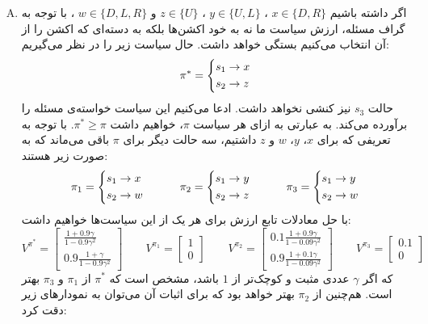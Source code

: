 \documentclass[a4paper, 12pt]{article}
\begin{document}
\begin{enumerate}[A)]
	\item
	اگر داشته باشیم
	$x \in \{D, R\}$
	،
	$y \in \{U, L\}$
	،
	$z \in \{U\}$
	و
	$w \in \{D, L, R\}$
	،
	با توجه به گراف مسئله، ارزش سیاست ما نه به خود اکشن‌ها بلکه به دسته‌ای که اکشن را از آن انتخاب می‌کنیم بستگی خواهد داشت. حال سیاست زیر را در نظر می‌گیریم:
	\[
	\pi^{\ast} = \begin{dcases}
		s_1 \to x \\
		s_2 \to z
	\end{dcases}
	\]
	حالت $s_3$ نیز کنشی نخواهد داشت. ادعا می‌کنیم این سیاست خواسته‌ی مسئله را برآورده می‌کند. به عبارتی به ازای هر سیاست $\pi$، خواهیم داشت
	$\pi^\ast \ge \pi$.
	با توجه به تعریفی که برای
	$x$، $y$، $w$ و $z$
	داشتیم، سه حالت دیگر برای $\pi$ باقی می‌ماند که به صورت زیر هستند:
	\[
	\pi_1 = \begin{dcases}
		s_1 \to x \\
		s_2 \to w
	\end{dcases} \qquad \quad
	\pi_2 = \begin{dcases}
		s_1 \to y \\
		s_2 \to z
	\end{dcases} \qquad \quad
	\pi_3 = \begin{dcases}
		s_1 \to y \\
		s_2 \to w
	\end{dcases}
	\]
	با حل معادلات تابع ارزش برای هر یک از این سیاست‌ها خواهیم داشت:
	\[
	V^{\pi^\ast} = \left[\begin{array}{c}
		\frac{1+0.9\gamma}{1-0.9\gamma^2} \\
		0.9\frac{1+\gamma}{1-0.9\gamma^2}
	\end{array}\right]
	\qquad V^{\pi_1} = \left[\begin{array}{c}
		1 \\
		0
	\end{array}\right]
	\qquad V^{\pi_2} = \left[\begin{array}{c}
		0.1\frac{1+0.9\gamma}{1-0.09\gamma^2} \\
		0.9\frac{1+0.1\gamma}{1-0.09\gamma^2}
	\end{array}\right]
	\qquad V^{\pi_3} = \left[\begin{array}{c}
		0.1 \\
		0
	\end{array}\right]
	\]
	که اگر $\gamma$ عددی مثبت و کوچک‌تر از $1$ باشد، مشخص است که $\pi^\ast$ از
	$\pi_1$
	و
	$\pi_3$
	بهتر است. هم‌چنین از $\pi_2$ بهتر خواهد بود که برای اثبات آن می‌توان به نمودار‌های زیر دقت کرد:

\end{enumerate}
\end{document}

